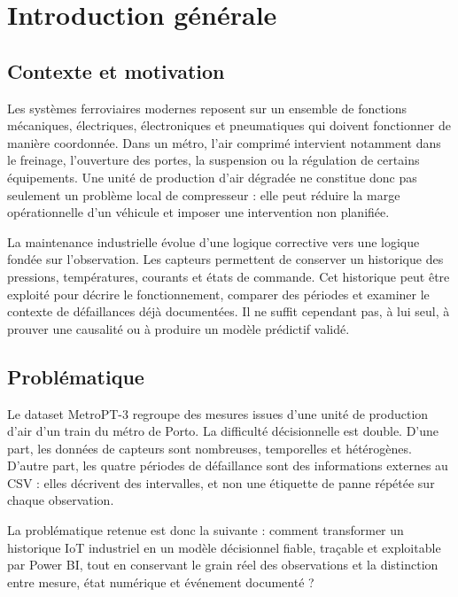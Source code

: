 \chapter{Introduction générale}

\section{Contexte et motivation}
Les systèmes ferroviaires modernes reposent sur un ensemble de fonctions mécaniques, électriques, électroniques et pneumatiques qui doivent fonctionner de manière coordonnée. Dans un métro, l'air comprimé intervient notamment dans le freinage, l'ouverture des portes, la suspension ou la régulation de certains équipements. Une unité de production d'air dégradée ne constitue donc pas seulement un problème local de compresseur : elle peut réduire la marge opérationnelle d'un véhicule et imposer une intervention non planifiée.

La maintenance industrielle évolue d'une logique corrective vers une logique fondée sur l'observation. Les capteurs permettent de conserver un historique des pressions, températures, courants et états de commande. Cet historique peut être exploité pour décrire le fonctionnement, comparer des périodes et examiner le contexte de défaillances déjà documentées. Il ne suffit cependant pas, à lui seul, à prouver une causalité ou à produire un modèle prédictif validé.

\section{Problématique}
Le dataset MetroPT-3 regroupe des mesures issues d'une unité de production d'air d'un train du métro de Porto. La difficulté décisionnelle est double. D'une part, les données de capteurs sont nombreuses, temporelles et hétérogènes. D'autre part, les quatre périodes de défaillance sont des informations externes au CSV : elles décrivent des intervalles, et non une étiquette de panne répétée sur chaque observation.

La problématique retenue est donc la suivante : comment transformer un historique IoT industriel en un modèle décisionnel fiable, traçable et exploitable par Power BI, tout en conservant le grain réel des observations et la distinction entre mesure, état numérique et événement documenté ?

